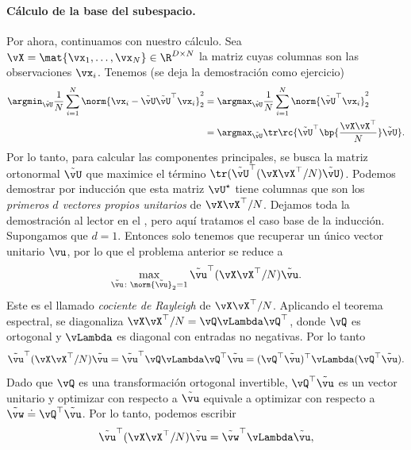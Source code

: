 \documentclass[../../book-main.tex]{subfiles}
\begin{document}
\paragraph{Cálculo de la base del subespacio.}
Por ahora, continuamos con nuestro cálculo. Sea \(\vX = \mat{\vx_{1},
\dots, \vx_{N}} \in \R^{D \times N}\) la matriz cuyas columnas son
las observaciones \(\vx_{i}\). Tenemos (se deja la demostración como ejercicio)
\begin{align}
    \argmin_{\tilde{\vU}}\frac{1}{N}\sum_{i = 1}^{N}\norm{\vx_{i} -
    \tilde{\vU}\tilde{\vU}^{\top}\vx_{i}}_{2}^{2}
    &= \argmax_{\tilde{\vU}}\frac{1}{N}\sum_{i =
    1}^{N}\norm{\tilde{\vU}^{\top}\vx_{i}}_{2}^{2} \\
    &=
    \argmax_{\tilde{\vU}}\tr\rc{\tilde{\vU}^{\top}\bp{\frac{\vX\vX^{\top}}{N}}\tilde{\vU}}.
\end{align}
Por lo tanto, para calcular las componentes principales, se busca la matriz ortonormal
\(\tilde{\vU}\) que maximice el término 
\(\tr(\tilde{\vU}^{\top}(\vX\vX^{\top}/N)\tilde{\vU})\). Podemos demostrar por
inducción que esta matriz \(\vU^{\star}\) tiene columnas que son los
\textit{primeros \(d\) vectores propios unitarios} de \(\vX\vX^{\top}/N\). Dejamos
toda la demostración al lector en el , 
pero aquí tratamos el caso base de la inducción. Supongamos que \(d = 1\). Entonces solo
tenemos que recuperar un único vector unitario \(\vu\), por lo que el problema anterior 
se reduce a
\begin{equation}
    \max_{\tilde{\vu} \colon \norm{\tilde{\vu}}_{2} = 1}
    \tilde{\vu}^{\top}(\vX\vX^{\top}/N)\tilde{\vu}.
\end{equation}
Este es el llamado \textit{cociente de Rayleigh} de
\(\vX\vX^{\top}/N\). Aplicando el teorema espectral, se diagonaliza
\(\vX\vX^{\top}/N = \vQ\vLambda\vQ^{\top}\), donde \(\vQ\) es
ortogonal y \(\vLambda\) es diagonal con entradas no negativas. Por lo tanto
\begin{equation}
    \tilde{\vu}^{\top}(\vX\vX^{\top}/N)\tilde{\vu} =
    \tilde{\vu}^{\top}\vQ\vLambda\vQ^{\top}\tilde{\vu} =
    (\vQ^{\top}\tilde{\vu})^{\top}\vLambda(\vQ^{\top}\tilde{\vu}).
\end{equation}
Dado que \(\vQ\) es una transformación ortogonal invertible,
\(\vQ^{\top}\tilde{\vu}\) es un vector unitario y optimizar con respecto a
\(\tilde{\vu}\) equivale a optimizar con respecto a \(\tilde{\vw} \doteq
\vQ^{\top}\tilde{\vu}\). Por lo tanto, podemos escribir
\begin{equation}
    \tilde{\vu}^{\top}(\vX\vX^{\top}/N)\tilde{\vu} =
    \tilde{\vw}^{\top}\vLambda\tilde{\vu},
\end{equation}
\end{document}
